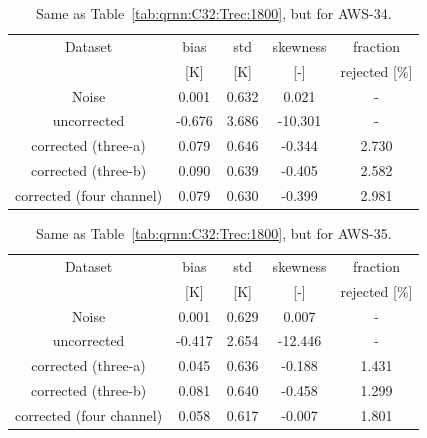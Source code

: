 \documentclass[12pt]{article}
\begin{document}
\begin{table}[!p]
	\centering
	\begin{tabular}[b]{c|c|c|c|c}
		Dataset  		  &   bias &   std &   skewness & fraction  \\
		&   [K]  &   [K] & [-] & rejected [\%]\\
		\hline
	Noise                       &  0.001 & 0.632 &              0.021 &      - \\
	uncorrected                 & -0.676 & 3.686 &            -10.301 &      - \\
	corrected (three-a) 		&  0.079 & 0.646 &             -0.344 &      2.730 \\
    corrected (three-b) 		&  0.090 & 0.639 &             -0.405 &      2.582 \\
	corrected (four channel)    &  0.079 & 0.630 &             -0.399 &      2.981 \\
		\hline
	\end{tabular}
	\caption{Same as Table~\ref{tab:qrnn:C32:Trec:1800}, but for AWS-34. }
	\label{tab:qrnn:C34:Trec:1800}
\end{table}

\begin{table}[!p]
	\centering
	\begin{tabular}[b]{c|c|c|c|c}
		Dataset  		  &   bias &   std &   skewness & fraction  \\
		&   [K]  &   [K] & [-] & rejected [\%]\\
		\hline
Noise                       &  0.001 & 0.629 &              0.007 &      - \\
uncorrected                 & -0.417 & 2.654 &            -12.446 &      - \\
corrected (three-a)  		&  0.045 & 0.636 &             -0.188 &      1.431 \\
corrected (three-b)  		&  0.081 & 0.640 &             -0.458 &      1.299 \\
corrected (four channel)    &  0.058 & 0.617 &             -0.007 &      1.801 \\
		\hline
	\end{tabular}
	\caption{Same as Table~\ref{tab:qrnn:C32:Trec:1800}, but for AWS-35. }
	\label{tab:qrnn:C35:Trec:1800}
\end{table}
\end{document}
